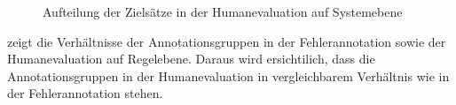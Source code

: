 \begin{figure}

\caption{\label{fig:4:7}Aufteilung der Zielsätze in der Humanevaluation auf Systemebene}
\end{figure}

 zeigt die Verhältnisse der Annotationsgruppen in der Fehlerannotation sowie der Humanevaluation auf Regelebene. Daraus wird ersichtilich, dass die Annotationsgruppen in der Humanevaluation in vergleichbarem Verhältnis wie in der Fehlerannotation stehen.


